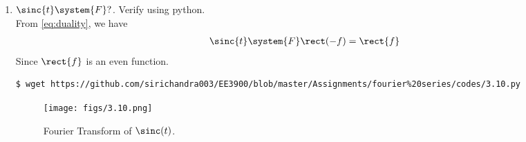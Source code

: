 \documentclass[journal,12pt,twocolumn]{IEEEtran}
\renewcommand\thesection{\arabic{section}}
\begin{document}
\begin{enumerate}[label=\thesection.\arabic*
,ref=\thesection.\theenumi]
\begin{align}
\rect{t}&\system{F}\int_{-\infty}^{\infty}\rect{t}e^{-\j2\pi ft}\, dt \\
&=\int_{-\frac{1}{2}}^{\frac{1}{2}}e^{-\j2\pi ft}\, dt \\
&=\frac{e^{\j\pi f} - e^{-\j\pi f}}{\j2\pi f} = \frac{\sin{\pi f}}{\pi f} = \sinc{f}
\label{eq:fourier-rect}
\end{align}
The python code \texttt{codes/3.9.py} verifies \eqref{eq:fourier-rect}.
\begin{figure}[!ht]
\texttt{[image: figs/3.9.png]}
\caption{Fourier Transform of $\rect(t)$.}
\label{eq:fig-fourier-rect}
\end{figure}

\item
$     \sinc{t}\system{F} ?$. Verify using python.\\
\solution From \eqref{eq:duality}, we have
\begin{align}
\sinc{t}\system{F}\rect(-f)=\rect{f}
\label{eq:fourier-sinc}
\end{align}
Since $\rect{f}$ is an even function.
\begin{lstlisting}
$ wget https://github.com/sirichandra003/EE3900/blob/master/Assignments/fourier%20series/codes/3.10.py
\end{lstlisting}
\begin{figure}[!ht]
\texttt{[image: figs/3.10.png]}
\caption{Fourier Transform of $\sinc(t)$.}
\label{eq:fig-fourier-sinc}
\end{figure}
\end{enumerate}
\end{document}
